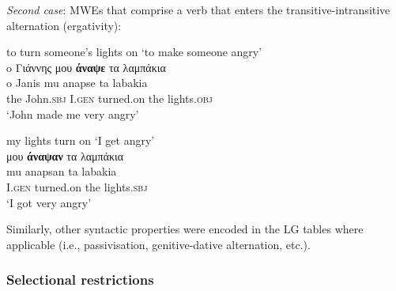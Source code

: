\documentclass[output=paper]{langsci/langscibook}
\begin{document}
\textit{Second case}: MWEs that comprise a verb that enters the transitive-intransitive
alternation (ergativity):

\begin{exe}
\settowidth {}
\ex \label{ex:3:33}
to turn someone's lights on `to make someone angry'\\
\glll  o Γιάννης μου \textbf{άναψε} τα λαμπάκια	 \\
o Janis mu anapse ta labakia {}\\
the John.\textsc{sbj} I.\textsc{gen} turned.on the lights.\textsc{obj} \\ 
\glt %
‘John made me very angry’
\end{exe}

\begin{exe}
\settowidth {}
\ex \label{ex:3:34}
my lights turn on `I get angry'\\
\glll μου \textbf{άναψαν} τα λαμπάκια	 \\
 	mu anapsan ta labakia\\
	I.\textsc{gen} turned.on the lights.\textsc{sbj}\\ 
\glt  	%
‘I got very angry’
\end{exe}

Similarly, other syntactic properties were encoded in the LG tables
where applicable (i.e., passivisation, genitive-dative alternation,
etc.).


\subsubsection{Selectional restrictions}
\end{document}

